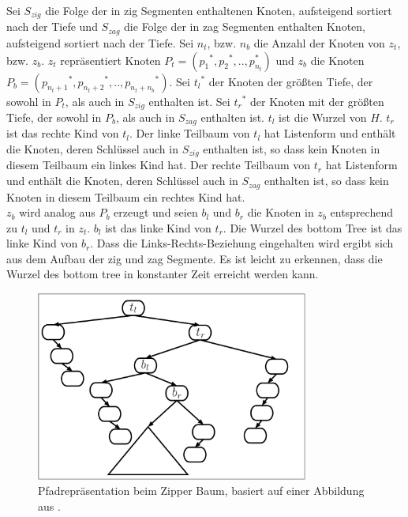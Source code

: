 \documentclass[a4paper,12pt]{article}
\begin{document}
Sei $S_{zig}$ die Folge der in zig Segmenten enthaltenen Knoten, aufsteigend sortiert nach der Tiefe und $S_{zag}$ die Folge der in zag Segmenten enthalten Knoten, aufsteigend sortiert nach der Tiefe.  Sei $n_t$, bzw. $n_b$ die Anzahl der Knoten von $z_t$, bzw. $z_b$. $z_t$ repräsentiert Knoten  $P_t = \left({p_1}^*,{p_2}^*,..,p_{n_t}^*\right)$ und $z_b$ die Knoten  $P_b = \left({p_{n_t + 1}}^*,{p_{n_t + 2}}^*,..,{p_{n_t + n_b}}^*\right)$.
Sei ${t_l}^*$ der Knoten der größten Tiefe, der sowohl in $P_t$, als auch in $S_{zig}$ enthalten ist. Sei ${t_r}^*$ der Knoten mit der größten Tiefe, der sowohl in $P_b$, als auch in $S_{zag}$ enthalten ist. $t_l$ ist die Wurzel von $H$. $t_r$ ist das rechte Kind von $t_l$. Der linke Teilbaum von $t_l$  hat Listenform und  enthält die  Knoten, deren Schlüssel auch in  $S_{zig}$ enthalten ist, so dass kein Knoten in diesem Teilbaum ein linkes Kind hat. Der rechte Teilbaum von $t_r$  hat Listenform und  enthält die  Knoten, deren Schlüssel auch in $S_{zag}$ enthalten ist, so dass kein Knoten in diesem Teilbaum ein rechtes Kind hat. \\
$z_b$ wird analog aus $P_b$ erzeugt und seien $b_l$ und $b_r$ die Knoten in $z_b$ entsprechend zu $t_l$ und $t_r$ in $z_t$. $b_l$ ist das linke Kind von $t_r$. Die Wurzel des bottom Tree ist das linke Kind von $b_r$. Dass die Links-Rechts-Beziehung eingehalten wird ergibt sich aus dem Aufbau der zig und zag Segmente. Es ist leicht zu erkennen, dass die Wurzel des bottom tree in konstanter Zeit erreicht werden kann.
\begin{figure}[H]
	\centering
	\includegraphics[width= 0.8\textwidth]{Medien/Zipper/zipperPathRep}
	\caption{Pfadrepräsentation beim Zipper Baum, basiert auf einer Abbildung aus \cite{zipper}. }
	\label{fig:zipperPathRep}
\end{figure}
\end{document}
